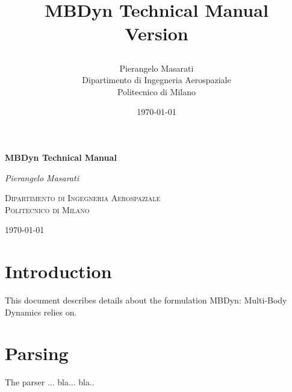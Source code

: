 \documentclass[10pt,dvips]{report}
\begin{document}
\begin{latexonly}
\title{\bf MBDyn Technical Manual \\
Version

}
\author{Pierangelo Masarati \vspace{5mm}\\
    \sc Dipartimento di Ingegneria Aerospaziale \\
    \sc Politecnico di Milano}
\date{\today}
\maketitle
\end{latexonly}

\begin{htmlonly}
\begin{center}
\textbf{\LARGE MBDyn Technical Manual}

\emph{\large Pierangelo Masarati}

\textsc{Dipartimento di Ingegneria Aerospaziale \\ Politecnico di Milano}

\today
\end{center}
\end{htmlonly}




\tableofcontents
\newpage

\chapter{Introduction}
This document describes details about the formulation MBDyn:
Multi-Body Dynamics relies on.

\chapter{Parsing}
The parser ... bla... bla.. 
\end{document}
